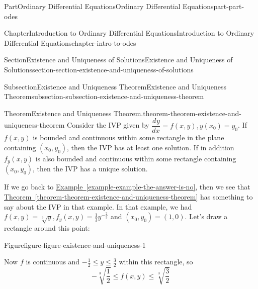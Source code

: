\documentclass[twoside,10pt,]{book}
\newcommand{\xreffont}{\relax}
\numberwithin{equation}{part}
\newcommand{\dv}[3][]{\dfrac{d^{#1} #2}{d #3^{#1}}}
\begin{document}
\begin{partptx}{Part}{Ordinary Differential Equations}{}{Ordinary Differential Equations}{}{}{part-part-odes}
\begin{chapterptx}{Chapter}{Introduction to Ordinary Differential Equations}{}{Introduction to Ordinary Differential Equations}{}{}{chapter-intro-to-odes}
\begin{sectionptx}{Section}{Existence and Uniqueness of Solutions}{}{Existence and Uniqueness of Solutions}{}{}{section-section-existence-and-uniqueness-of-solutions}
\begin{subsectionptx}{Subsection}{Existence and Uniqueness Theorem}{}{Existence and Uniqueness Theorem}{}{}{subsection-subsection-existence-and-uniqueness-theorem}
\begin{theorem}{Theorem}{Existence and Uniqueness Theorem.}{}{theorem-theorem-existence-and-uniqueness-theorem}%
%
Consider the IVP given by \(\dv{y}{x} = f(x,y), y(x_{0}) = y_{0}\). If \(f(x,y)\) is bounded and continuous within some rectangle in the plane containing \((x_{0},y_{0})\), then the IVP has at least one solution. If in addition \(f_{y}(x,y)\) is also bounded and continuous within some rectangle containing \((x_{0},y_{0})\), then the IVP has a unique solution.%
\end{theorem}
If we go back to \hyperref[example-example-the-answer-is-no]{Example~{\xreffont\ref{example-example-the-answer-is-no}}}, then we see that \hyperref[theorem-theorem-existence-and-uniqueness-theorem]{Theorem~{\xreffont\ref{theorem-theorem-existence-and-uniqueness-theorem}}} has something to say about the IVP in that example. In that example, we had \(f(x,y) = \sqrt[3]{y}, f_{y}(x,y) = \frac{1}{3}y^{-\frac{2}{3}}\) and \((x_{0},y_{0}) = (1,0)\). Let's draw a rectangle around this point: \begin{figureptx}{Figure}{}{figure-figure-existence-and-uniqueness-1}{}%
\begin{image}{0.25}{0.5}{0.25}{}%
%
\end{image}%
\tcblower
\end{figureptx}%
%
\par
Now \(f\) is continuous and \(-\frac{1}{2}\leq y\leq\frac{3}{2}\) within this rectangle, so%
\begin{equation*}
-\sqrt[3]{\frac{1}{2}}\leq f(x,y)\leq\sqrt[3]{\frac{3}{2}}
\end{equation*}

\end{subsectionptx}
\end{sectionptx}
\end{chapterptx}
\end{partptx}
\end{document}
